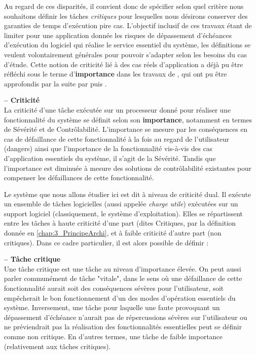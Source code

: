 \documentclass[french, a4paper, 11pt, twoside, pdftex]{StyleThese}
\begin{document}
	Au regard de ces disparités, il convient donc de spécifier selon quel critère nous souhaitons définir les tâches \textit{critiques} pour lesquelles nous désirons conserver des garanties de temps d'exécution pire cas. L'objectif inclusif de ces travaux étant de limiter pour une application donnée les risques de dépassement d'échéances d'exécution du logiciel qui réalise le service essentiel du système, les définitions se veulent volontairement générales pour pouvoir s'adapter selon les besoins du cas d'étude. Cette notion de criticité lié à des cas réels d'application a déjà pu être réfléchi sous le terme d'\textbf{importance} dans les travaux de \cite{fleming_extending_2013}, qui ont pu être approfondis par la suite par \cite{bletsas_decoupling_2018} puis \cite{sundar_practical_2019}.
	
	\begin{definition}\textbf{ -- Criticité} \\
		La criticité d'une tâche exécutée sur un processeur donné pour réaliser une fonctionnalité du système se définit selon son \textbf{importance}, notamment en termes de Sévérité et de Contrôlabilité. L'importance se mesure par les conséquences en cas de défaillance de cette fonctionnalité à la fois au regard de l'utilisateur (dangers) ainsi que l'importance de la fonctionnalité vis-à-vis des cas d'application essentiels du système, il s'agit de la Sévérité. Tandis que l'importance est diminuée à mesure des solutions de contrôlabilité existantes pour compenser les défaillances de cette fonctionnalité.
	\end{definition}

    Le système que nous allons étudier ici est dit à niveau de criticité dual. Il exécute un ensemble de tâches logicielles (aussi appelée \textit{charge utile}) exécutées sur un support logiciel (classiquement, le système d'exploitation). Elles se répartissent entre les tâches à haute criticité d'une part (dites Critiques, par la définition donnée en \ref{chap:3_PrincipeArchi}, et à faible criticité d'autre part (non critiques). 	Dans ce cadre particulier, il est alors possible de définir : 
    
    \begin{definition}\textbf{ -- Tâche critique} \\
    	Une tâche critique est une tâche au niveau d'importance élevée. On peut aussi parler communément de tâche "vitale", dans le sens où une défaillance de cette fonctionnalité aurait soit des conséquences sévères pour l'utilisateur, soit empêcherait le bon fonctionnement d'un des modes d'opération essentiels du système.
    	Inversement, une tâche pour laquelle une faute provoquant un dépassement d'échéance n'aurait pas de répercussions sévères sur l'utilisateur ou ne préviendrait pas la réalisation des fonctionnalités essentielles peut se définir comme non critique. En d'autres termes, une tâche de faible importance (relativement aux tâches critiques).
    \end{definition}
    
\end{document}
